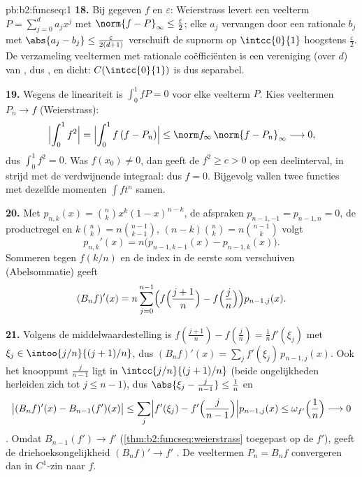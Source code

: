 \begin{solution}{pb:b2:funcseq:1}
\textbf{18.} Bij gegeven $f$ en $\varepsilon$: Weierstrass levert
een veelterm $P = \sum_{j=0}^d a_jx^j$ met $\norm{f - P}_\infty
\leq \frac\varepsilon2$; elke $a_j$ vervangen door een rationale
$b_j$ met $\abs{a_j - b_j} \leq \frac{\varepsilon}{2(d+1)}$
verschuift de supnorm op $\intcc{0}{1}$ hoogstens
$\frac\varepsilon2$. De verzameling veeltermen met rationale
coëfficiënten is een  vereniging (over $d$) van , dus , en dicht: $C(\intcc{0}{1})$ is dus
separabel.

\textbf{19.} Wegens de lineariteit is $\int_0^1 fP = 0$ voor elke
veelterm $P$. Kies veeltermen $P_n \to f$  (Weierstrass):
\[
\Bigl|\int_0^1 f^2\Bigr|
= \Bigl|\int_0^1 f\,(f - P_n)\Bigr|
\leq \norm f_\infty\,\norm{f - P_n}_\infty
\longrightarrow 0 ,
\]
dus $\int_0^1 f^2 = 0$. Was $f(x_0) \neq 0$, dan geeft de
 $f^2 \geq c > 0$ op een deelinterval, in strijd met
de verdwijnende integraal: dus $f = 0$. Bijgevolg vallen twee
 functies met dezelfde momenten $\int f t^n$ samen.

\textbf{20.} Met $p_{n,k}(x) = \binom nk x^k(1-x)^{n-k}$, de
afspraken $p_{n-1,-1} = p_{n-1,n} = 0$, de productregel en
$k\binom nk = n\binom{n-1}{k-1}$, $(n-k)\binom nk =
n\binom{n-1}{k}$ volgt
\[
p_{n,k}'(x) = n\bigl(p_{n-1,k-1}(x) - p_{n-1,k}(x)\bigr) .
\]
Sommeren tegen $f(k/n)$ en de index in de eerste som verschuiven
(Abelsommatie) geeft
\[
(B_nf)'(x) = n\sum_{j=0}^{n-1}\Bigl(f\Bigl(\frac{j+1}n\Bigr)
- f\Bigl(\frac jn\Bigr)\Bigr)p_{n-1,j}(x) .
\]

\textbf{21.} Volgens de middelwaardestelling is $f(\frac{j+1}n) -
f(\frac jn) = \frac1n f'(\xi_j)$ met $\xi_j \in
\intoo{j/n}{(j+1)/n}$, dus $(B_nf)'(x) = \sum_j
f'(\xi_j)\,p_{n-1,j}(x)$. Ook het knooppunt $\frac{j}{n-1}$ ligt in
$\intcc{j/n}{(j+1)/n}$ (beide ongelijkheden herleiden zich tot $j
\leq n-1$), dus $\abs{\xi_j - \frac j{n-1}} \leq \frac1n$ en
\[
\bigl|(B_nf)'(x) - B_{n-1}(f')(x)\bigr|
\leq \sum_j\Bigl|f'(\xi_j) -
f'\Bigl(\frac{j}{n-1}\Bigr)\Bigr| p_{n-1,j}(x)
\leq \omega_{f'}\Bigl(\frac1n\Bigr) \longrightarrow 0
\]
. Omdat $B_{n-1}(f') \to f'$ 
(\cref{thm:b2:funcseq:weierstrass} toegepast op de  $f'$),
geeft de driehoeksongelijkheid $(B_nf)' \to f'$ . De
veeltermen $P_n = B_nf$ convergeren dan in $C^1$-zin naar $f$.


\end{solution}
